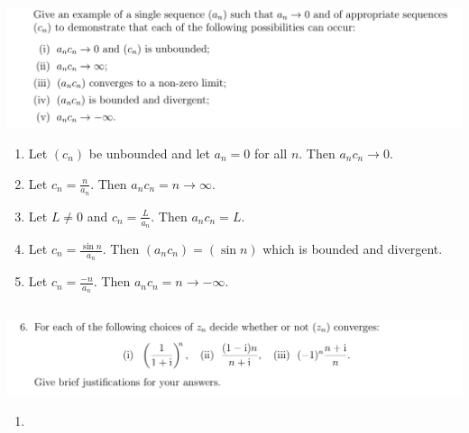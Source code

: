 \documentclass[12pt]{article}
\begin{document}
\begin{mdframed}
  \includegraphics[width=400pt]{img/oxford-M2-analysis-I-3-5-2.png}
\end{mdframed}

\begin{enumerate}[label=(\roman*)]
\item Let $(c_n)$ be unbounded and let $a_n = 0$ for all $n$. Then $a_nc_n \to 0$.
\item Let $c_n = \frac{n}{a_n}$. Then $a_nc_n = n \to \infty$.
\item Let $L \neq 0$ and $c_n = \frac{L}{a_n}$. Then $a_nc_n = L$.
\item Let $c_n = \frac{\sin n}{a_n}$. Then $(a_nc_n) = (\sin n)$ which is bounded and divergent.
\item Let $c_n = \frac{-n}{a_n}$. Then $a_nc_n = n \to -\infty$.
\end{enumerate}

\newpage
\subsection{}
\begin{mdframed}
\includegraphics[width=400pt]{img/oxford-M2-analysis-I-3-6.png}
\end{mdframed}

\begin{enumerate}[label=(\roman*)]
\item
\end{enumerate}

\newpage
\end{document}
